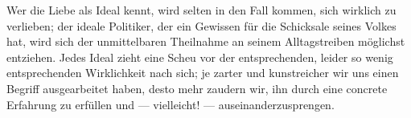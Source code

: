 Wer die Liebe als Ideal kennt, wird selten in den Fall kommen, sich wirklich zu verlieben; der ideale Politiker, der ein Gewissen für die Schicksale seines Volkes hat, wird sich der unmittelbaren Theilnahme an seinem Alltagstreiben möglichst entziehen. Jedes Ideal zieht eine Scheu vor der entsprechenden, leider so wenig entsprechenden Wirklichkeit nach sich; je zarter und kunstreicher wir uns einen Begriff ausgearbeitet haben, desto mehr zaudern wir, ihn durch eine concrete Erfahrung zu erfüllen und — vielleicht! — auseinanderzusprengen.
\par

